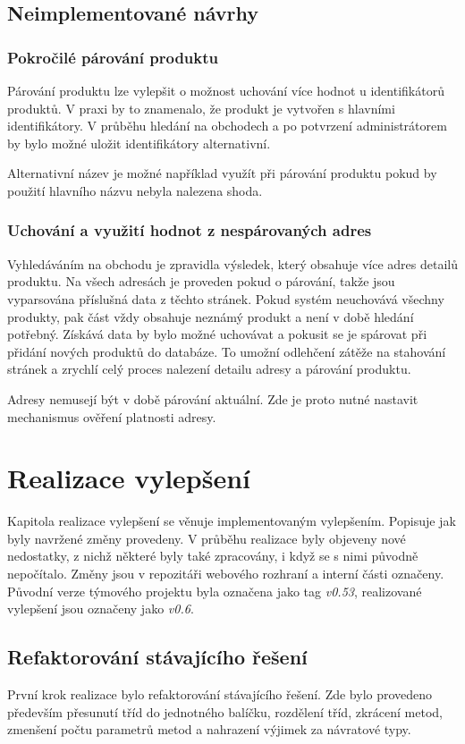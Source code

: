 \documentclass[thesis=B,czech]{FITthesis}[2012/06/26]
\begin{document}
\section{Neimplementované návrhy}
\subsection{Pokročilé párování produktu}
Párování produktu lze vylepšit o možnost uchování více hodnot u identifikátorů produktů. V praxi by to znamenalo, že produkt je vytvořen 
s hlavními identifikátory. V průběhu hledání na obchodech a po potvrzení administrátorem by bylo možné uložit identifikátory alternativní.
\par
Alternativní název je možné například využít při párování produktu pokud by použití hlavního názvu nebyla nalezena shoda.

\subsection{Uchování a využití hodnot z nespárovaných adres}
Vyhledáváním na obchodu je zpravidla výsledek, který obsahuje více adres detailů produktu. Na všech adresách je proveden pokud o párování, takže
jsou vyparsována příslušná data z těchto stránek. Pokud systém neuchovává všechny produkty, pak část vždy obsahuje neznámý produkt a není v době hledání potřebný. Získává data by bylo možné uchovávat a pokusit se je spárovat při přidání nových produktů do databáze.
To umožní odlehčení zátěže na stahování stránek a zrychlí celý proces nalezení detailu adresy a párování produktu.
\par
Adresy nemusejí být v době párování aktuální. Zde je proto nutné nastavit mechanismus ověření platnosti adresy.


\chapter{Realizace vylepšení}\label{ch:realisation}
Kapitola realizace vylepšení se věnuje implementovaným vylepšením. Popisuje jak byly navržené změny provedeny.
V průběhu realizace byly objeveny nové nedostatky, z nichž některé byly také zpracovány, i když se s nimi původně nepočítalo.
Změny jsou v repozitáři webového rozhraní a interní části označeny. Původní verze týmového projektu byla označena jako
tag \textit{v0.53}, realizované vylepšení jsou označeny jako \textit{v0.6}.

\section{Refaktorování stávajícího řešení}
První krok realizace bylo refaktorování stávajícího řešení. Zde bylo provedeno především přesunutí tříd do jednotného balíčku, 
rozdělení tříd, zkrácení metod, zmenšení počtu parametrů metod a nahrazení výjimek za návratové typy.
\end{document}
